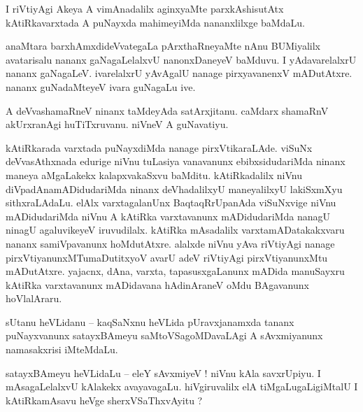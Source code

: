 \documentclass{article}
\begin{document}
\begin{mn}%
I riVtiyAgi Akeya A vimAnadalilx aginxyaMte parxkAshisutAtx kAtiRkavarxtada A puNayxda mahimeyiMda 
nananxlilxge baMdaLu.
\end{mn}

\begin{mn}%
anaMtara barxhAmxdideVvategaLa pArxthaRneyaMte nAnu BUMiyalilx avatarisalu nananx gaNagaLelalxvU 
nanonxDaneyeV baMduvu. I yAdavarelalxrU nananx gaNagaLeV. ivarelalxrU yAvAgalU nanage 
pirxyavanenxV mADutAtxre. nananx guNadaMteyeV ivara guNagaLu ive.
\end{mn}

\begin{mn}%
A deVvashamaRneV ninanx taMdeyAda satArxjitanu. caMdarx shamaRnV akUrxranAgi huTiTxruvanu. niVneV A 
guNavatiyu.
\end{mn}

\begin{mn}%
kAtiRkarada varxtada puNayxdiMda nanage pirxVtikaraLAde. viSuNx deVvasAthxnada edurige niVnu 
tuLasiya vanavanunx ebibxsidudariMda ninanx maneya aMgaLakekx kalapxvakaSxvu baMditu. 
kAtiRkadalilx niVnu diVpadAnamADidudariMda ninanx deVhadalilxyU maneyalilxyU lakiSxmXyu 
sithxraLAdaLu. elAlx varxtagalanUnx BaqtaqRrUpanAda viSuNxvige niVnu mADidudariMda niVnu A kAtiRka 
varxtavanunx mADidudariMda nanagU ninagU agaluvikeyeV iruvudilalx. kAtiRka mAsadalilx 
varxtamADatakakxvaru nananx samiVpavanunx hoMdutAtxre. alalxde niVnu yAva riVtiyAgi nanage 
pirxVtiyanunxMTumaDutitxyoV avarU adeV riVtiyAgi pirxVtiyanunxMtu mADutAtxre. yajacnx, dAna, 
varxta, tapasusxgaLanunx mADida manuSayxru kAtiRka varxtavanunx mADidavana hAdinAraneV oMdu 
BAgavanunx hoVlalAraru.
\end{mn}

\begin{mn}%
sUtanu heVLidanu -- kaqSaNxnu heVLida pUravxjanamxda tananx puNayxvanunx satayxBAmeyu 
saMtoVSagoMDavaLAgi A sAvxmiyanunx namasakxrisi iMteMdaLu.
\end{mn}


\begin{mn}%
satayxBAmeyu heVLidaLu -- eleY sAvxmiyeV ! niVnu kAla savxrUpiyu. I mAsagaLelalxvU kAlakekx 
avayavagaLu. hiVgiruvalilx elA tiMgaLugaLigiMtalU I kAtiRkamAsavu heVge sherxVSaThxvAyitu ?
\end{mn}
\end{document}
